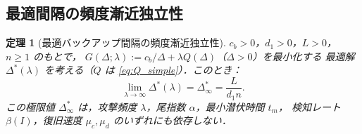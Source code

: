 \documentclass[12pt,a4paper]{article}
\theoremstyle{plain}
\newtheorem{theorem}{定理}[section]
\theoremstyle{definition}
\theoremstyle{remark}
\newcommand{\betaI}{\beta(I)}
\newcommand{\Dopt}{\Delta^{*}}
\newcommand{\Dinf}{\Delta^{*}_{\infty}}
\begin{document}
\subsection{最適間隔の頻度漸近独立性}

\begin{theorem}[最適バックアップ間隔の頻度漸近独立性]\label{thm:delta_inf}
$c_b>0$，$d_1>0$，$L>0$，$n\ge1$ のもとで，
$G(\Delta;\lambda):=c_b/\Delta+\lambda Q(\Delta)$（$\Delta>0$）を最小化する
最適解 $\Dopt(\lambda)$ を考える（$Q$ は \eqref{eq:Q_simple}）．このとき：
\begin{equation}\label{eq:convergence}
\lim_{\lambda\to\infty}\Dopt(\lambda)=\Dinf=\frac{L}{d_1 n}.
\end{equation}
この極限値 $\Dinf$ は，攻撃頻度 $\lambda$，尾指数 $\alpha$，最小潜伏時間 $t_m$，
検知レート $\betaI$，復旧速度 $\mu_c,\mu_d$ のいずれにも依存しない．
\end{theorem}
\end{document}
